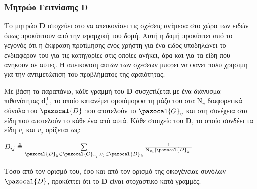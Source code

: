 \subsubsection{Μητρώο Γειτνίασης $\mathbf{D}$}
Το μητρώο $\mathbf{D}$ στοχεύει στο να απεικονίσει τις σχέσεις ανάμεσα στο χώρο των ειδών όπως προκύπτουν από την ιεραρχική του δομή. Αυτή η δομή προκύπτει από το γεγονός ότι η έκφραση προτίμησης ενός χρήστη για ένα είδος υποδηλώνει το ενδιαφέρον του για τις κατηγορίες στις οποίες ανήκει, άρα και για τα είδη που ανήκουν σε αυτές. Η απεικόνιση αυτών των σχέσεων μπορεί να φανεί πολύ χρήσιμη για την αντιμετώπιση του προβλήματος της αραιότητας. \par
Με βάση τα παραπάνω, κάθε γραμμή του $\mathbf{D}$ συσχετίζεται με ένα διάνυσμα πιθανότητας $\mathbf{d}_v^\text{T}$, το οποίο κατανέμει ομοιόμορφα τη μάζα του στα $\text{N}_v$ διαφορετικά σύνολα του $\pazocal{D}$ που αποτελούν το $\pazocal{G}_v$ και στη συνέχεια στα είδη που αποτελούν το κάθε ένα από αυτά. Κάθε στοιχείο του $\mathbf{D}$, το οποίο συνδέει τα είδη $v_i$ και $v_j$ ορίζεται ως:
\begin{center}
$D_{ij} \triangleq \sum\limits_{\pazocal{D}_k \in \pazocal{G}_{v_i}, v_j \in \pazocal{D}_k} \frac{1}{\text{N}_{v_i}|\pazocal{D}_k|}$
\end{center}
Τόσο από τον ορισμό του, όσο και από τον ορισμό της οικογένειας συνόλων $\pazocal{D}$, προκύπτει ότι το $\mathbf{D}$ είναι στοχαστικό κατά γραμμές. 
